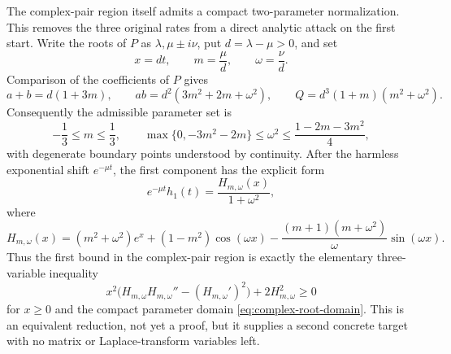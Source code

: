 \documentclass[11pt]{article}
\theoremstyle{remark}
\begin{document}
The complex-pair region itself admits a compact two-parameter normalization.
This removes the three original rates from a direct analytic attack on the
first start.  Write the roots of $P$ as
$\lambda,\mu\mathbin\pm i\nu$, put $d=\lambda-\mu>0$, and set
\[
 x=dt,\qquad m=\frac{\mu}{d},\qquad \omega=\frac{\nu}{d}.
\]
Comparison of the coefficients of $P$ gives
\[
 a+b=d(1+3m),\qquad
 ab=d^2(3m^2+2m+\omega^2),\qquad
 Q=d^3(1+m)(m^2+\omega^2).
\]
Consequently the admissible parameter set is
\begin{equation}\label{eq:complex-root-domain}
 -\frac13\leq m\leq\frac13,
 \qquad
 \max\{0,-3m^2-2m\}\leq\omega^2
 \leq\frac{1-2m-3m^2}{4},
\end{equation}
with degenerate boundary points understood by continuity.  After the harmless
exponential shift $e^{-\mu t}$, the first component has the explicit form
\begin{equation}\label{eq:complex-root-first-start}
 e^{-\mu t}h_1(t)=\frac{H_{m,\omega}(x)}{1+\omega^2},
\end{equation}
where
\[
 H_{m,\omega}(x)
 =(m^2+\omega^2)e^x+(1-m^2)\cos(\omega x)
 -\frac{(m+1)(m+\omega^2)}{\omega}\sin(\omega x).
\]
Thus the first bound in the complex-pair region is exactly the elementary
three-variable inequality
\begin{equation}\label{eq:complex-root-curvature}
 x^2\bigl(H_{m,\omega}H_{m,\omega}''-(H_{m,\omega}')^2\bigr)
 +2H_{m,\omega}^2\geq0
\end{equation}
for $x\geq0$ and the compact parameter domain
\eqref{eq:complex-root-domain}.  This is an equivalent reduction, not yet a
proof, but it supplies a second concrete target with no matrix or
Laplace-transform variables left.
\end{document}

